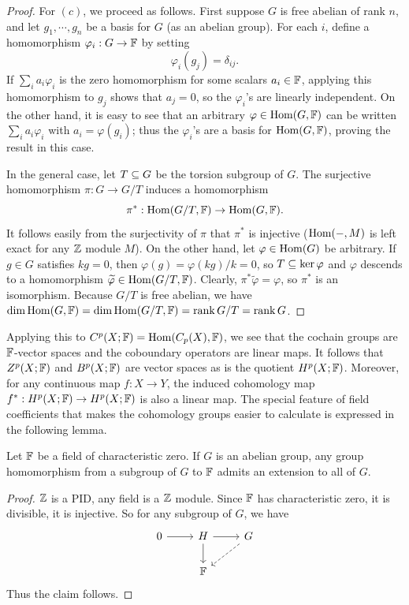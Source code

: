 \begin{proof}
For $(c)$, we proceed as follows. First suppose $G$ is free abelian of rank $n$, and let $g_1,\cdots,g_n$ be a basis for $G$ (as an abelian group). For each $i$, define a homomorphism $\varphi_i:G\to\mathbb{F}$ by setting
\[\varphi_i(g_j)=\delta_{ij}.\]
If $\sum_ia_i\varphi_i$ is the zero homomorphism for some scalars $a_i\in\mathbb{F}$, applying this homomorphism to $g_j$ shows that $a_j=0$, so the $\varphi_i$'s are linearly independent. On the other hand, it is easy to see that an arbitrary $\varphi\in\mathrm{Hom}(G,\mathbb{F})$ can be written $\sum_ia_i\varphi_i$ with $a_i=\varphi(g_i)$; thus the $\varphi_i$'s are a basis for $\mathrm{Hom}(G,\mathbb{F})$, proving the result in this case.\par
In the general case, let $T\subseteq G$ be the torsion subgroup of $G$. The surjective homomorphism $\pi:G\to G/T$ induces a homomorphism
\[\pi^*:\mathrm{Hom}(G/T,\mathbb{F})\to\mathrm{Hom}(G,\mathbb{F}).\]
It follows easily from the surjectivity of $\pi$ that $\pi^*$ is injective ($\mathrm{Hom}(-,M)$ is left exact for any $\mathbb{Z}$ module $M$). On the other hand, let $\varphi\in\mathrm{Hom}(G)$ be arbitrary. If $g\in G$ satisfies $kg=0$, then $\varphi(g)=\varphi(kg)/k=0$, so $T\subseteq\mathrm{ker}\,\varphi$ and $\varphi$ descends to a homomorphism $\widetilde{\varphi}\in\mathrm{Hom}(G/T,\mathbb{F})$. Clearly, $\pi^*\widetilde{\varphi}=\varphi$, so $\pi^*$ is an isomorphism. Because $G/T$ is free abelian, we have $\dim\mathrm{Hom}(G,\mathbb{F})=\dim\mathrm{Hom}(G/T,\mathbb{F})=\mathrm{rank}\, G/T=\mathrm{rank}\, G$.
\end{proof}
Applying this to $C^p(X;\mathbb{F})=\mathrm{Hom}(C_p(X),\mathbb{F})$, we see that the cochain groups are $\mathbb{F}$-vector spaces and the coboundary operators are linear maps. It follows that $Z^p(X;\mathbb{F})$ and $B^p(X;\mathbb{F})$ are vector spaces as is the quotient $H^p(X;\mathbb{F})$. Moreover, for any continuous map $f:X\to Y$, the induced cohomology map $f^*:H^p(X;\mathbb{F})\to H^p(X;\mathbb{F})$ is also a linear map.
The special feature of field coefficients that makes the cohomology groups easier to calculate is expressed in the following lemma.
\begin{lemma}
Let $\mathbb{F}$ be a field of characteristic zero. If $G$ is an abelian group, any group homomorphism from a subgroup of $G$ to $\mathbb{F}$ admits an extension to all of $G$.
\end{lemma}
\begin{proof}
$\mathbb{Z}$ is a PID, any field is a $\mathbb{Z}$ module. Since $\mathbb{F}$ has characteristic zero, it is divisible, it is injective. So for any subgroup of $G$, we have
\[\begin{tikzcd}
0\ar[r]&H\ar[d]\ar[r]&G\ar[ld,dashed]\\
&\F
\end{tikzcd}\]
Thus the claim follows.
\end{proof}
